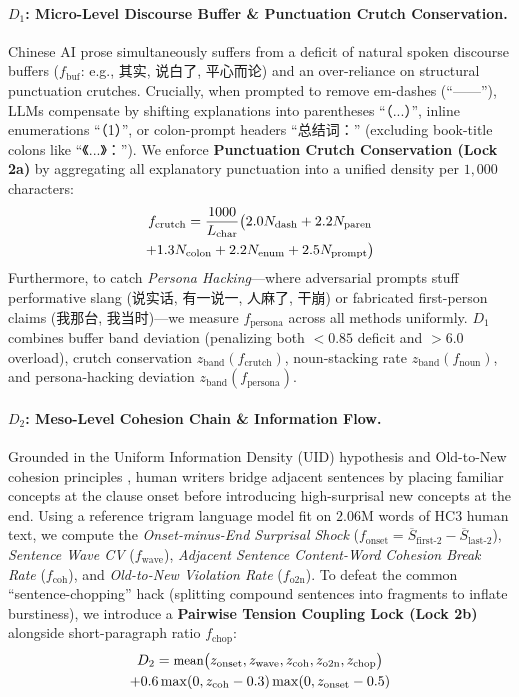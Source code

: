 \documentclass[11pt]{article}
\newcommand{\zh}[1]{#1}
\begin{document}
\paragraph{$D_1$: Micro-Level Discourse Buffer \& Punctuation Crutch Conservation.}
Chinese AI prose simultaneously suffers from a deficit of natural spoken discourse buffers ($f_{\text{buf}}$: e.g., \zh{其实, 说白了, 平心而论}) and an over-reliance on structural punctuation crutches. Crucially, when prompted to remove em-dashes (``\zh{——}''), LLMs compensate by shifting explanations into parentheses ``\zh{（...）}'', inline enumerations ``\zh{（1）}'', or colon-prompt headers ``\zh{总结词：}'' (excluding book-title colons like ``\zh{《...》：}''). We enforce \textbf{Punctuation Crutch Conservation (Lock 2a)} by aggregating all explanatory punctuation into a unified density per $1,000$ characters:
\begin{multline}
\small
f_{\text{crutch}} = \frac{1000}{L_{\text{char}}} \big( 2.0 N_{\text{dash}} + 2.2 N_{\text{paren}} \\
+ 1.3 N_{\text{colon}} + 2.2 N_{\text{enum}} + 2.5 N_{\text{prompt}} \big)
\end{multline}
Furthermore, to catch \textit{Persona Hacking}---where adversarial prompts stuff performative slang (\zh{说实话, 有一说一, 人麻了, 干崩}) or fabricated first-person claims (\zh{我那台, 我当时})---we measure $f_{\text{persona}}$ across all methods uniformly. $D_1$ combines buffer band deviation (penalizing both $<0.85$ deficit and $>6.0$ overload), crutch conservation $z_{\text{band}}(f_{\text{crutch}})$, noun-stacking rate $z_{\text{band}}(f_{\text{noun}})$, and persona-hacking deviation $z_{\text{band}}(f_{\text{persona}})$.

\paragraph{$D_2$: Meso-Level Cohesion Chain \& Information Flow.}
Grounded in the Uniform Information Density (UID) hypothesis \cite{levy2007speakers,uidpo2026} and Old-to-New cohesion principles \cite{nyusurprisal2026}, human writers bridge adjacent sentences by placing familiar concepts at the clause onset before introducing high-surprisal new concepts at the end. Using a reference trigram language model fit on $2.06\text{M}$ words of HC3 human text, we compute the \textit{Onset-minus-End Surprisal Shock} ($f_{\text{onset}} = \overline{S}_{\text{first-2}} - \overline{S}_{\text{last-2}}$), \textit{Sentence Wave CV} ($f_{\text{wave}}$), \textit{Adjacent Sentence Content-Word Cohesion Break Rate} ($f_{\text{coh}}$), and \textit{Old-to-New Violation Rate} ($f_{\text{o2n}}$). To defeat the common ``sentence-chopping'' hack (splitting compound sentences into fragments to inflate burstiness), we introduce a \textbf{Pairwise Tension Coupling Lock (Lock 2b)} alongside short-paragraph ratio $f_{\text{chop}}$:
\begin{multline}
\small
D_2 = \text{mean}\big(z_{\text{onset}}, z_{\text{wave}}, z_{\text{coh}}, z_{\text{o2n}}, z_{\text{chop}}\big) \\
+ 0.6 \max(0, z_{\text{coh}} - 0.3)\max(0, z_{\text{onset}} - 0.5)
\end{multline}
\end{document}
